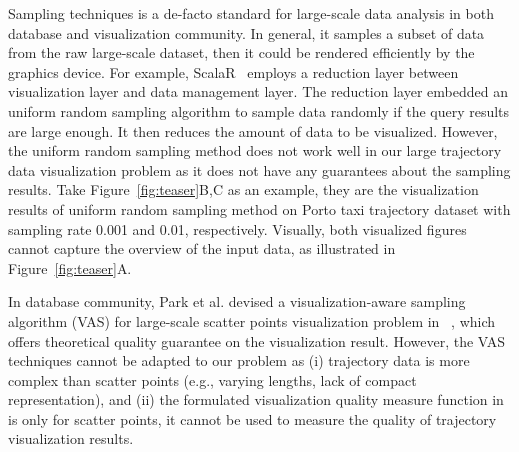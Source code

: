 Sampling techniques is a de-facto standard for large-scale data analysis in both database and visualization community.
In general, it samples a subset of data from the raw large-scale dataset, then it could be rendered efficiently by the graphics device.
For example, ScalaR~\cite{battle2013dynamic} employs a reduction layer between visualization layer and data management layer.
The reduction layer embedded an uniform random sampling algorithm to sample data randomly if the query results are large enough.
It then reduces the amount of data to be visualized.
However, the uniform random sampling method does not work well in our large trajectory data visualization problem as it does not have any guarantees about the sampling results.
Take Figure~\ref{fig:teaser}B,C as an example,
they are the visualization results of uniform random sampling method on Porto taxi trajectory dataset with sampling rate 0.001 and 0.01, respectively.
Visually, both visualized figures cannot capture the overview of the input data, as illustrated in Figure~\ref{fig:teaser}A.

In database community,  Park et al. devised a visualization-aware sampling algorithm (VAS) for large-scale scatter points visualization problem in ~\cite{park2016visualization},
which offers theoretical quality guarantee on the visualization result.
However, the VAS techniques cannot be adapted to our problem as  (i) trajectory data is  more complex than scatter points (e.g., varying lengths, lack of compact representation),
and  (ii) the formulated visualization quality measure function in~\cite{park2016visualization} is only for scatter points, it cannot be used to measure the quality of trajectory visualization results.

